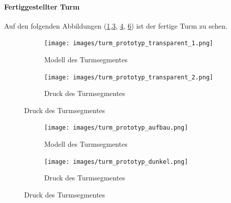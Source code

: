 \clearpage

\paragraph{Fertiggestellter Turm}

Auf den folgenden Abbildungen (\ref{fig:turm_prototyp_transparent_1},\ref{fig:turm_prototyp_transparent_2}, \ref{fig:turm_prototyp_aufbau}, \ref{fig:turm_prototyp_dunkel}) ist der fertige Turm zu sehen.

\begin{figure}[H]
  \centering
  \begin{subfigure}[b]{0.49\textwidth}
    \centering
    \texttt{[image: images/turm\_prototyp\_transparent\_1.png]}
    \caption{Modell des Turmsegmentes}
    \label{fig:turm_prototyp_transparent_1}
  \end{subfigure}
  \begin{subfigure}[b]{0.49\textwidth}
    \centering
    \texttt{[image: images/turm\_prototyp\_transparent\_2.png]}
    \caption{Druck des Turmsegmentes}
    \label{fig:turm_prototyp_transparent_2}
  \end{subfigure}
\end{figure}

\begin{figure}[H]
  \centering
  \begin{subfigure}[b]{0.49\textwidth}
    \centering
    \texttt{[image: images/turm\_prototyp\_aufbau.png]}
    \caption{Modell des Turmsegmentes}
    \label{fig:turm_prototyp_aufbau}
  \end{subfigure}
  \begin{subfigure}[b]{0.49\textwidth}
    \centering
    \texttt{[image: images/turm\_prototyp\_dunkel.png]}
    \caption{Druck des Turmsegmentes}
    \label{fig:turm_prototyp_dunkel}
  \end{subfigure}
\end{figure}
